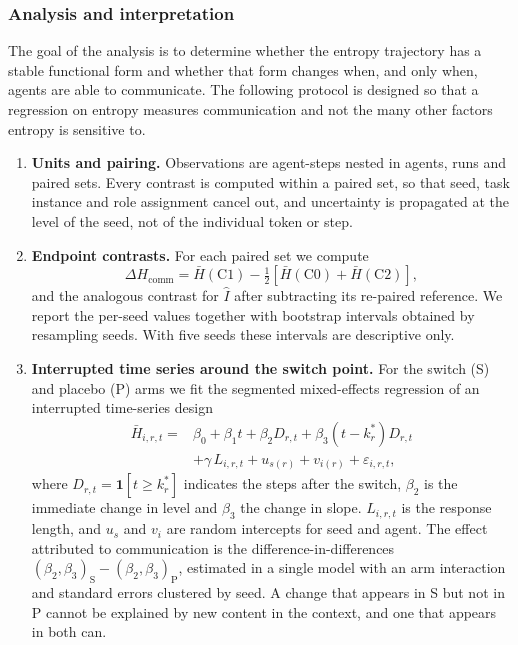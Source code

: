 \subsubsection{Analysis and interpretation}
\label{sec:analysis}

The goal of the analysis is to determine whether the entropy trajectory has a stable functional form and whether that form changes when, and only when, agents are able to communicate. The following protocol is designed so that a regression on entropy measures communication and not the many other factors entropy is sensitive to.

\begin{enumerate}
  \item \textbf{Units and pairing.} Observations are agent-steps nested in agents, runs and paired sets. Every contrast is computed within a paired set, so that seed, task instance and role assignment cancel out, and uncertainty is propagated at the level of the seed, not of the individual token or step.

  \item \textbf{Endpoint contrasts.} For each paired set we compute
  \begin{equation}
    \Delta H_{\mathrm{comm}} = \bar{H}(\mathrm{C1}) - \tfrac{1}{2}\left[\bar{H}(\mathrm{C0}) + \bar{H}(\mathrm{C2})\right],
    \label{eq:delta_comm}
  \end{equation}
  and the analogous contrast for $\hat{I}$ after subtracting its re-paired reference. We report the per-seed values together with bootstrap intervals obtained by resampling seeds. With five seeds these intervals are descriptive only.

  \item \textbf{Interrupted time series around the switch point.} For the switch (S) and placebo (P) arms we fit the segmented mixed-effects regression of an interrupted time-series design \parencite{wagner2002segmented}
  \begin{equation}
  \begin{aligned}
    \bar{H}_{i,r,t} ={}& \beta_0 + \beta_1 t + \beta_2 D_{r,t} + \beta_3 (t - k^{*}_r) D_{r,t} \\
      &+ \gamma\, L_{i,r,t} + u_{s(r)} + v_{i(r)} + \varepsilon_{i,r,t},
  \end{aligned}
  \label{eq:its}
  \end{equation}
  where $D_{r,t} = \mathbf{1}[t \geq k^{*}_r]$ indicates the steps after the switch, $\beta_2$ is the immediate change in level and $\beta_3$ the change in slope. $L_{i,r,t}$ is the response length, and $u_{s}$ and $v_{i}$ are random intercepts for seed and agent. The effect attributed to communication is the difference-in-differences $(\beta_2, \beta_3)_{\mathrm{S}} - (\beta_2, \beta_3)_{\mathrm{P}}$, estimated in a single model with an arm interaction and standard errors clustered by seed. A change that appears in S but not in P cannot be explained by new content in the context, and one that appears in both can.


\end{enumerate}
